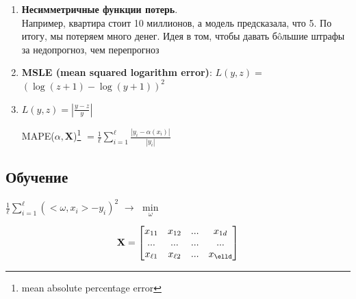 \begin{enumerate}
            \item \textbf{Несимметричные функции потерь}.\\

            Например, квартира стоит 10 миллионов, а модель предсказала, что 5. По итогу, мы потеряем много денег. Идея в том, чтобы давать бôльшие штрафы за недопрогноз, чем перепрогноз


                
            \item \textbf{MSLE (mean squared logarithm error)}: $L(y, z) = $ $(\log(z+1) - \log(y+1))^2$

            \item $L(y, z) = |\frac{y - z}{y}|$\\

                \begin{center}
                    \large{MAPE($\alpha, \mathbf{X}$)\footnote{mean absolute percentage error} $= \frac{1}{\ell}\sum\limits_{i=1}^\ell \frac{|y_i - \alpha(x_i)|}{|y_i|}$}
                \end{center}

            \end{enumerate}



    \subsection{Обучение}
        \begin{center}
            \large{$\frac{1}{\ell}\sum\limits_{i=1}^\ell (<\omega, x_i> - y_i)^2$ $\longrightarrow$ $\min\limits_\omega$}
        \end{center}

        
        \[\mathbf{X} = 
        \begin{bmatrix}
            x_{11} & x_{12} & ... & x_{1d} \\
            ... & ... & ... & ... \\
            x_{\ell1} & x_{\ell2} & ... & x_{\elld} \\
        \end{bmatrix}
        \]

